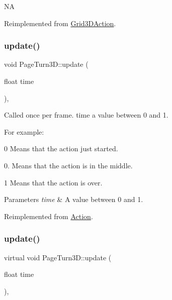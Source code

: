 NA 

Reimplemented from \hyperlink{classGrid3DAction_ad68b52ba318636b43a4c7aab0a9c2887}{Grid3\+D\+Action}.

\mbox{\label{classPageTurn3D_afe5bcf11756795416fc882a3b0be1c66}} 
\subsubsection{\texorpdfstring{update()}{update()}\hspace{0.1cm}{\footnotesize\ttfamily [1/2]}}
{\footnotesize\ttfamily void Page\+Turn3\+D\+::update (\begin{DoxyParamCaption}\item[{float}]{time }\end{DoxyParamCaption})\hspace{0.3cm}{\ttfamily [override]}, {\ttfamily [virtual]}}

Called once per frame. time a value between 0 and 1.

For example\+:
\begin{DoxyItemize}
\item 0 Means that the action just started.
\item 0. Means that the action is in the middle.
\item 1 Means that the action is over.
\end{DoxyItemize}


\begin{DoxyParams}{Parameters}
{\em time} & A value between 0 and 1. \\
\hline
\end{DoxyParams}


Reimplemented from \hyperlink{classAction_a937e646e63915e33ad05ba149bfcf239}{Action}.

\mbox{\label{classPageTurn3D_a5d1f2853531e5a8ee8857c287c4f3cbc}} 
\subsubsection{\texorpdfstring{update()}{update()}\hspace{0.1cm}{\footnotesize\ttfamily [2/2]}}
{\footnotesize\ttfamily virtual void Page\+Turn3\+D\+::update (\begin{DoxyParamCaption}\item[{float}]{time }\end{DoxyParamCaption})\hspace{0.3cm}{\ttfamily [override]}, {\ttfamily [virtual]}}

